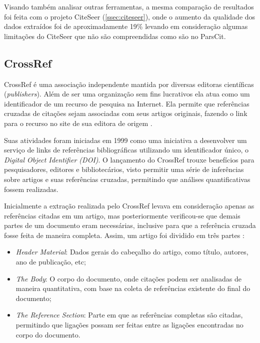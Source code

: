 Visando também analisar outras ferramentas, a mesma comparação de resultados foi feita com o projeto CiteSeer (\autoref{ssec:citeseer}), onde o aumento da qualidade dos dados extraídos foi de aproximadamente 19\% levando em consideração algumas limitações do CiteSeer que não são compreendidas como são no ParsCit.


    

\subsection{CrossRef}
\label{ssec:crossref}

CrossRef é uma associação independente mantida por diversas editoras científicas (\emph{publishers}). Além de ser uma organização sem fins lucrativos ela atua como um identificador de um recurso de pesquisa na Internet. Ela permite que referências cruzadas de citações sejam associadas com seus artigos originais, fazendo o link para o recurso no site de sua editora de origem \cite{Bergmark:2000:AER:867169}.

Suas atividades foram iniciadas em 1999 como uma iniciativa a desenvolver um serviço de links de referências bibliográficas utilizando um identificador único, o \emph{Digital Object Identifier (DOI)}. O lançamento do CrossRef trouxe benefícios para pesquisadores, editores e bibliotecários, visto permitir uma série de inferências sobre artigos e suas referências cruzadas, permitindo que análises quantificativas fossem realizadas.

Inicialmente a extração realizada pelo CrossRef levava em consideração apenas as referências citadas em um artigo, mas posteriormente verificou-se que demais partes de um documento eram necessárias, inclusive para que a referência cruzada fosse feita de maneira completa. Assim, um artigo foi dividido em três partes \cite{Bergmark:2000:AER:867169}:

\begin{itemize}
    \item \emph{Header Material}: Dados gerais do cabeçalho do artigo, como título, autores, ano de publicação, etc;
    \item \emph{The Body}: O corpo do documento, onde citações podem ser analisadas de maneira quantitativa, com base na coleta de referências existente do final do documento;
    \item \emph{The Reference Section}: Parte em que as referências completas são citadas, permitindo que ligações possam ser feitas entre as ligações encontradas no corpo do documento.
\end{itemize}

